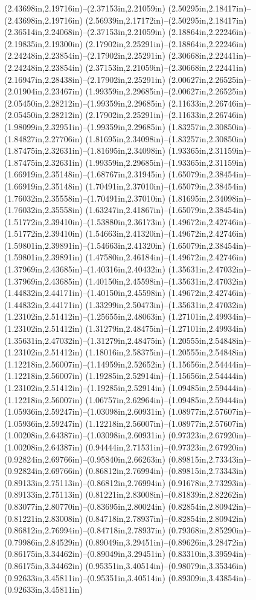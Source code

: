 (2.43698in,2.19716in)--(2.37153in,2.21059in) (2.50295in,2.18417in)--(2.43698in,2.19716in) (2.56939in,2.17172in)--(2.50295in,2.18417in) (2.36514in,2.24068in)--(2.37153in,2.21059in) (2.18864in,2.22246in)--(2.19835in,2.19300in) (2.17902in,2.25291in)--(2.18864in,2.22246in) (2.24248in,2.23854in)--(2.17902in,2.25291in) (2.30668in,2.22441in)--(2.24248in,2.23854in) (2.37153in,2.21059in)--(2.30668in,2.22441in) (2.16947in,2.28438in)--(2.17902in,2.25291in) (2.00627in,2.26525in)--(2.01904in,2.23467in) (1.99359in,2.29685in)--(2.00627in,2.26525in) (2.05450in,2.28212in)--(1.99359in,2.29685in) (2.11633in,2.26746in)--(2.05450in,2.28212in) (2.17902in,2.25291in)--(2.11633in,2.26746in) (1.98099in,2.32951in)--(1.99359in,2.29685in) (1.83257in,2.30850in)--(1.84827in,2.27706in) (1.81695in,2.34098in)--(1.83257in,2.30850in) (1.87475in,2.32631in)--(1.81695in,2.34098in) (1.93365in,2.31159in)--(1.87475in,2.32631in) (1.99359in,2.29685in)--(1.93365in,2.31159in) (1.66919in,2.35148in)--(1.68767in,2.31945in) (1.65079in,2.38454in)--(1.66919in,2.35148in) (1.70491in,2.37010in)--(1.65079in,2.38454in) (1.76032in,2.35558in)--(1.70491in,2.37010in) (1.81695in,2.34098in)--(1.76032in,2.35558in) (1.63247in,2.41867in)--(1.65079in,2.38454in) (1.51772in,2.39410in)--(1.53880in,2.36173in) (1.49672in,2.42746in)--(1.51772in,2.39410in) (1.54663in,2.41320in)--(1.49672in,2.42746in) (1.59801in,2.39891in)--(1.54663in,2.41320in) (1.65079in,2.38454in)--(1.59801in,2.39891in) (1.47580in,2.46184in)--(1.49672in,2.42746in) (1.37969in,2.43685in)--(1.40316in,2.40432in) (1.35631in,2.47032in)--(1.37969in,2.43685in) (1.40150in,2.45598in)--(1.35631in,2.47032in) (1.44832in,2.44171in)--(1.40150in,2.45598in) (1.49672in,2.42746in)--(1.44832in,2.44171in) (1.33299in,2.50473in)--(1.35631in,2.47032in) (1.23102in,2.51412in)--(1.25655in,2.48063in) (1.27101in,2.49934in)--(1.23102in,2.51412in) (1.31279in,2.48475in)--(1.27101in,2.49934in) (1.35631in,2.47032in)--(1.31279in,2.48475in) (1.20555in,2.54848in)--(1.23102in,2.51412in) (1.18016in,2.58375in)--(1.20555in,2.54848in) (1.12218in,2.56007in)--(1.14959in,2.52652in) (1.15656in,2.54444in)--(1.12218in,2.56007in) (1.19285in,2.52914in)--(1.15656in,2.54444in) (1.23102in,2.51412in)--(1.19285in,2.52914in) (1.09485in,2.59444in)--(1.12218in,2.56007in) (1.06757in,2.62964in)--(1.09485in,2.59444in) (1.05936in,2.59247in)--(1.03098in,2.60931in) (1.08977in,2.57607in)--(1.05936in,2.59247in) (1.12218in,2.56007in)--(1.08977in,2.57607in) (1.00208in,2.64387in)--(1.03098in,2.60931in) (0.97323in,2.67920in)--(1.00208in,2.64387in) (0.94444in,2.71531in)--(0.97323in,2.67920in) (0.92824in,2.69766in)--(0.95840in,2.66263in) (0.89815in,2.73343in)--(0.92824in,2.69766in) (0.86812in,2.76994in)--(0.89815in,2.73343in) (0.89133in,2.75113in)--(0.86812in,2.76994in) (0.91678in,2.73293in)--(0.89133in,2.75113in) (0.81221in,2.83008in)--(0.81839in,2.82262in) (0.83077in,2.80770in)--(0.83695in,2.80024in) (0.82854in,2.80942in)--(0.81221in,2.83008in) (0.84718in,2.78937in)--(0.82854in,2.80942in) (0.86812in,2.76994in)--(0.84718in,2.78937in) (0.79368in,2.85290in)--(0.79986in,2.84529in) (0.89049in,3.29451in)--(0.89626in,3.28472in) (0.86175in,3.34462in)--(0.89049in,3.29451in) (0.83310in,3.39594in)--(0.86175in,3.34462in) (0.95351in,3.40514in)--(0.98079in,3.35346in) (0.92633in,3.45811in)--(0.95351in,3.40514in) (0.89309in,3.43854in)--(0.92633in,3.45811in) 